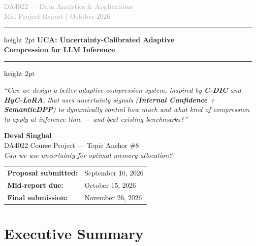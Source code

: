 \documentclass[11pt, a4paper]{article}
\begin{document}
\begin{titlepage}
\centering
\vspace*{1cm}

{\Large \textcolor{darkgray}{DA4022 --- Data Analytics \& Applications}}\\[0.3cm]
{\large \textcolor{darkgray}{Mid-Project Report | October 2026}}

\vspace{1.5cm}
\hrule height 2pt
\vspace{0.4cm}
{\LARGE \bfseries \textcolor{primaryblue}{UCA: Uncertainty-Calibrated Adaptive\\[0.3cm] Compression for LLM Inference}}
\vspace{0.4cm}
\hrule height 2pt

\vspace{1.5cm}

\begin{tcolorbox}[colback=lightgray, colframe=primaryblue!30, width=0.85\textwidth]
\centering
{\normalsize\itshape
``Can we design a better adaptive compression system, inspired by \textbf{C-DIC} and \textbf{HyC-LoRA}, that uses uncertainty signals (\textbf{Internal Confidence} + \textbf{SemanticDPP}) to dynamically control how much and what kind of compression to apply at inference time --- and beat existing benchmarks?''
}
\end{tcolorbox}

\vspace{1.5cm}

{\large \textbf{Deval Singhal}}\\[0.2cm]
{\normalsize DA4022 Course Project --- Topic Anchor \#8}\\[0.1cm]
{\normalsize \textit{Can we use uncertainty for optimal memory allocation?}}

\vspace{2cm}

\begin{tabular}{ll}
\textbf{Proposal submitted:} & September 10, 2026 \\
\textbf{Mid-report due:} & October 15, 2026 \\
\textbf{Final submission:} & November 26, 2026 \\
\end{tabular}

\vfill
\end{titlepage}

\section{Executive Summary}
\end{document}

